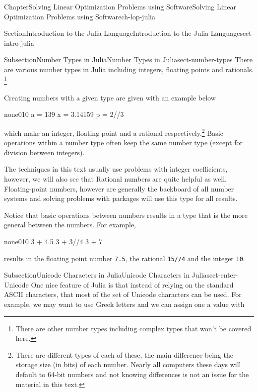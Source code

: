 \documentclass[oneside,10pt,]{book}
\newcommand{\mono}[1]{\texttt{#1}}
\numberwithin{equation}{section}
\begin{document}
\begin{chapterptx}{Chapter}{Solving Linear Optimization Problems using Software}{}{Solving Linear Optimization Problems using Software}{}{}{ch-lop-julia}
\begin{sectionptx}{Section}{Introduction to the Julia Language}{}{Introduction to the Julia Language}{}{}{sect-intro-julia}
\typeout{************************************************}
%
\begin{subsectionptx}{Subsection}{Number Types in Julia}{}{Number Types in Julia}{}{}{sect-number-types}
There are various number types in Julia including integers, floating points and rationals. \footnote{There are other number types including complex types that won't be covered here.\label{sect-number-types-2-1}}%
\par
Creating numbers with a given type are given with an example below%
\begin{program}{none}{0}{1}{0}
a = 139
x = 3.14159
p = 2//3
\end{program}
which make an integer, floating point and a rational respectively.\footnote{There are different types of each of these, the main difference being the storage size (in bits) of each number. Nearly all computers these days will default to 64-bit numbers and not knowing differences is not an issue for the material in this text.\label{sect-number-types-5-1}} Basic operations within a number type often keep the same number type (except for division between integers).%
\par
The techniques in this text usually use problems with integer coefficients, however, we will also see that Rational numbers are quite helpful as well. Floating-point numbers, however are generally the backboard of all number systems and solving problems with packages will use this type for all results.%
\par
Notice that basic operations between numbers results in a type that is the more general between the numbers. For example,%
\begin{program}{none}{0}{1}{0}
3 + 4.5
3 + 3//4
3 + 7
\end{program}
results in the floating point number \mono{7.5}, the rational \mono{15//4} and the integer \mono{10}.%
\end{subsectionptx}
%
%
\typeout{************************************************}
\typeout{************************************************}
%
\begin{subsectionptx}{Subsection}{Unicode Characters in Julia}{}{Unicode Characters in Julia}{}{}{sect-enter-Unicode}
One nice feature of Julia is that instead of relying on the standard ASCII characters, that most of the set of Unicode characters can be used. For example, we may want to use Greek letters and we can assign one a value with%
\par

\end{subsectionptx}
\end{sectionptx}
\end{chapterptx}
\end{document}
